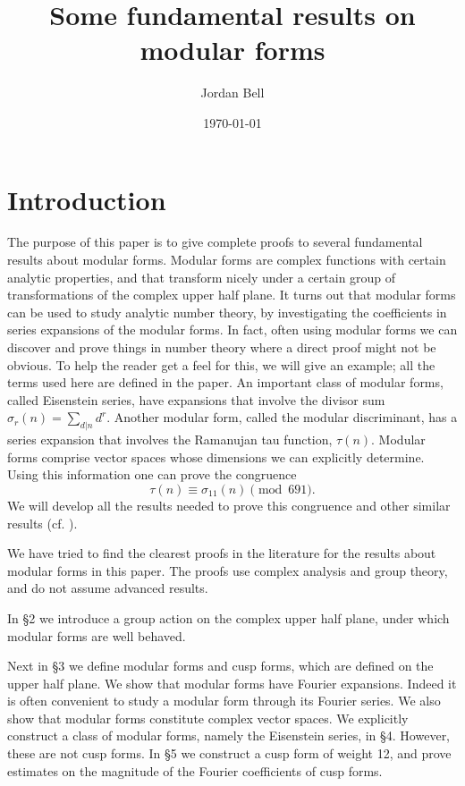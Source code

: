 \documentclass{article}
\begin{document}
\title{Some fundamental results on modular forms}
\author{Jordan Bell}
\date{\today}
\maketitle

\section{Introduction}
The purpose of this paper is to give complete proofs to several fundamental results about modular forms. Modular forms
are complex functions with certain analytic properties, and that transform nicely under a certain group of transformations
of the complex upper half plane. It turns out that modular forms can be used to study analytic number theory, by investigating
the coefficients in series expansions of the modular forms. In fact, often using
modular forms we can discover and prove things in number theory where a direct proof might not be obvious.
To help the reader get a feel for this, we will give an example; all the terms used here are defined in the paper.
An important class of modular forms, called Eisenstein series, have expansions that involve the divisor sum
$\sigma_r(n)=\sum_{d|n}d^r$. Another modular form, called the modular discriminant, has a series
expansion that involves the Ramanujan tau function, $\tau(n)$. Modular forms comprise vector spaces whose
dimensions we can explicitly determine. Using this  information one can prove
the congruence
\[
\tau(n) \equiv \sigma_{11}(n) \pmod{691}.
\]
We will develop all the results needed to prove this congruence and other similar
results (cf. \cite{MR938970}).

We have tried to find the clearest proofs in the literature for the results about modular forms in this paper.
The proofs use complex analysis and group theory, and do not assume advanced results.

In \S 2 we introduce a group action on the complex upper half plane, under which modular forms are well behaved.

Next in \S 3 we define modular forms and cusp forms, which are defined on the upper half plane.
We show that modular forms have Fourier expansions. Indeed it is often convenient to study a modular form through its
Fourier series. We also show that modular forms constitute complex vector spaces.
We explicitly construct 
a class of modular forms, namely the Eisenstein series, in \S 4. However, these are not cusp forms.
In \S 5 we construct a cusp form of weight 12,
and prove estimates on the magnitude of the Fourier coefficients of cusp forms.
\end{document}
